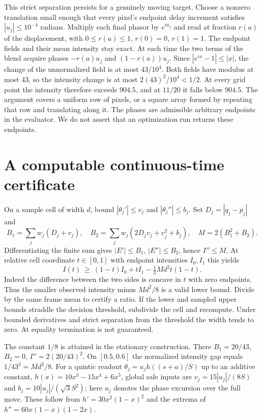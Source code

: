 \documentclass[11pt]{article}
\begin{document}
This strict separation persists for a genuinely moving target. Choose a nonzero translation small enough that every pixel's endpoint delay increment satisfies $|u_j|\le 10^{-4}$ radians. Multiply each final phasor by $e^{iu_j}$ and read at fraction $r(a)$ of the displacement, with $0\le r(a)\le1$, $r(0)=0$, $r(1)=1$. The endpoint fields and their mean intensity stay exact. At each time the two terms of the blend acquire phases $-r(a)u_j$ and $(1-r(a))u_j$. Since $|e^{ix}-1|\le |x|$, the change of the unnormalized field is at most $43/10^4$. Both fields have modulus at most 43, so the intensity change is at most $2(43)^2/10^4<1/2$. At every grid point the intensity therefore exceeds $904.5$, and at $11/20$ it falls below $904.5$. The argument covers a uniform row of pixels, or a square array formed by repeating that row and translating along it. The phases are admissible arbitrary endpoints in the evaluator. We do not assert that an optimization run returns these endpoints.

\section{A computable continuous-time certificate}
On a sample cell of width $d$, bound $|\theta_j'|\le v_j$ and $|\theta_j''|\le b_j$. Set $D_j=|q_j-p_j|$ and
\[
 B_1=\sum_jw_j(D_j+v_j),\quad
 B_2=\sum_jw_j(2D_jv_j+v_j^2+b_j),\quad M=2(B_1^2+B_2).
\]
Differentiating the finite sum gives $|E'|\le B_1$, $|E''|\le B_2$, hence $I''\le M$. At relative cell coordinate $t\in[0,1]$ with endpoint intensities $I_0,I_1$ this yields
\[
 I(t)\ \ge\ (1-t)I_0+t I_1-\tfrac12 M d^2t(1-t).
\]
Indeed the difference between the two sides is concave in $t$ with zero endpoints. Thus the smaller observed intensity minus $Md^2/8$ is a valid lower bound. Divide by the same frame mean to certify a ratio. If the lower and sampled upper bounds straddle the decision threshold, subdivide the cell and recompute. Under bounded derivatives and strict separation from the threshold the width tends to zero. At equality termination is not guaranteed.

The constant $1/8$ is attained in the stationary construction. There $B_1=20/43$, $B_2=0$, $I''=2(20/43)^2$. On $[0.5,0.6]$ the normalized intensity gap equals $1/43^2=Md^2/8$. For a quintic readout $\theta_j=u_j h((s+a)/S)$ up to an additive constant, $h(x)=10x^3-15x^4+6x^5$, global safe inputs are $v_j=15|u_j|/(8S)$ and $b_j=10|u_j|/(\sqrt3 S^2)$; here $u_j$ denotes the phase excursion over the full move. These follow from $h'=30x^2(1-x)^2$ and the extrema of $h''=60x(1-x)(1-2x)$.
\end{document}
